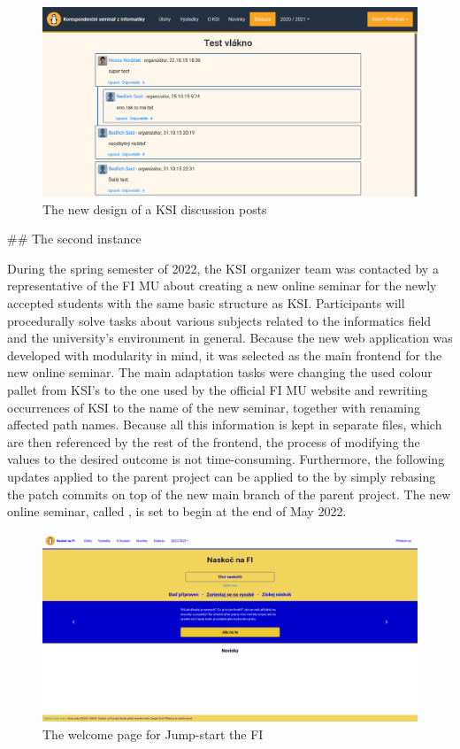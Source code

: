 \documentclass[
  digital, %
  oneside, %
  lof,     %
  nolot,     %
]{fithesis4}
\begin{document}
{\begin{figure}
\includegraphics[width=\textwidth]{assets/img/discussion-new}
\caption{The new design of a KSI discussion posts}
\label{fig:discuss-new}
\end{figure}

## The second instance

During the spring semester of 2022, the KSI organizer team was contacted by a representative of the FI MU about creating a new online seminar for the newly accepted students with the same basic structure as KSI. Participants will procedurally solve tasks about various subjects related to the informatics field and the university's environment in general. Because the new web application was developed with modularity in mind, it was selected as the main frontend for the new online seminar. The main adaptation tasks were changing the used colour pallet from KSI's to the one used by the official FI MU website and rewriting occurrences of KSI to the name of the new seminar, together with renaming affected path names. Because all this information is kept in separate files, which are then referenced by the rest of the frontend, the process of modifying the values to the desired outcome is not time-consuming. Furthermore, the following updates applied to the parent project can be applied to the  by simply rebasing the patch commits on top of the new main branch of the parent project. The new online seminar, called , is set to begin at the end of May 2022.

\begin{figure}
\includegraphics[width=\textwidth]{assets/img/naskoc-na-fi}
\caption{The welcome page for Jump-start the FI}
\label{fig:naskoc-na-fi}
\end{figure}

}
\end{document}
